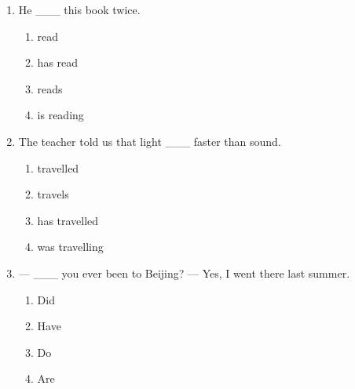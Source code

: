\documentclass[11pt,a4paper]{ctexart}
\begin{document}
\begin{enumerate}[leftmargin=*,itemsep=4pt]
\begin{enumerate}[label=\Alph*.,leftmargin=2em,itemsep=1pt,topsep=2pt]
\item have born
\end{enumerate}
\item He \_\_\_ this book twice.
\begin{enumerate}[label=\Alph*.,leftmargin=2em,itemsep=1pt,topsep=2pt]
\item read
\item has read
\item reads
\item is reading
\end{enumerate}
\item The teacher told us that light \_\_\_ faster than sound.
\begin{enumerate}[label=\Alph*.,leftmargin=2em,itemsep=1pt,topsep=2pt]
\item travelled
\item travels
\item has travelled
\item was travelling
\end{enumerate}
\item — \_\_\_ you ever been to Beijing? — Yes, I went there last summer.
\begin{enumerate}[label=\Alph*.,leftmargin=2em,itemsep=1pt,topsep=2pt]
\item Did
\item Have
\item Do
\item Are
\end{enumerate}
\end{enumerate}

\newpage
\end{document}
